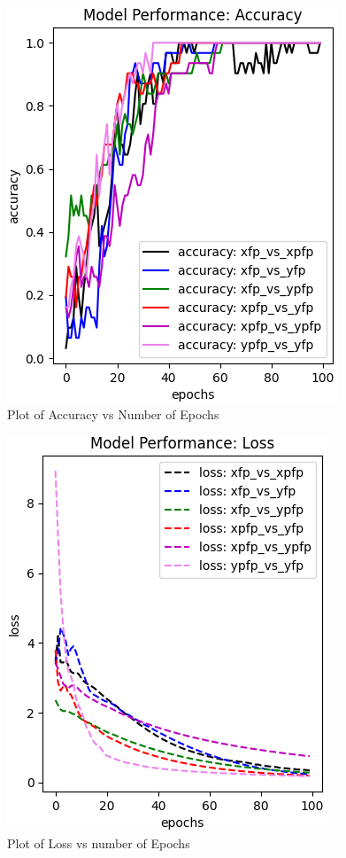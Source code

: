 \documentclass[conference]{IEEEtran}
\begin{document}
\begin{figure}[ht!]
  \centering
  \includegraphics[scale=0.6]{images/Results_part1.png}
  \caption{Plot of Accuracy vs Number of Epochs}
  \label{fig:Results_part1}
\end{figure}

\begin{figure}[ht!]
  \centering
  \includegraphics[scale=0.6]{images/Results_part2.png}
  \caption{Plot of Loss vs number of Epochs}
  \label{fig:Results_part2}
\end{figure}
\end{document}
